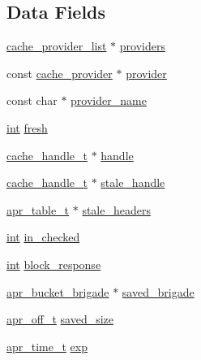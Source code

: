 \subsection*{Data Fields}
\begin{DoxyCompactItemize}
\item 
\hyperlink{structcache__provider__list}{cache\+\_\+provider\+\_\+list} $\ast$ \hyperlink{structcache__request__rec_afeb71f387482c679d90de359869b8e10}{providers}
\item 
const \hyperlink{structcache__provider}{cache\+\_\+provider} $\ast$ \hyperlink{structcache__request__rec_aa97c7f2b0167adee182cce9f2c66b0eb}{provider}
\item 
const char $\ast$ \hyperlink{structcache__request__rec_ad15b24a12858815a315f37152111b41d}{provider\+\_\+name}
\item 
\hyperlink{pcre_8txt_a42dfa4ff673c82d8efe7144098fbc198}{int} \hyperlink{structcache__request__rec_a00964c1b7d5f53314ea2a2b8899b5d93}{fresh}
\item 
\hyperlink{group__MOD__CACHE_ga6b7854a2592838a565bdee8f94343aab}{cache\+\_\+handle\+\_\+t} $\ast$ \hyperlink{structcache__request__rec_ade71ff36fe9a713fd081fa45524151f1}{handle}
\item 
\hyperlink{group__MOD__CACHE_ga6b7854a2592838a565bdee8f94343aab}{cache\+\_\+handle\+\_\+t} $\ast$ \hyperlink{structcache__request__rec_a17c5946aa60de5806a2af38ef7b91507}{stale\+\_\+handle}
\item 
\hyperlink{structapr__table__t}{apr\+\_\+table\+\_\+t} $\ast$ \hyperlink{structcache__request__rec_a7bdf3605a965ddd6b566babb830bde8b}{stale\+\_\+headers}
\item 
\hyperlink{pcre_8txt_a42dfa4ff673c82d8efe7144098fbc198}{int} \hyperlink{structcache__request__rec_a293ec343b59a0335dd1d0efd55a09dc6}{in\+\_\+checked}
\item 
\hyperlink{pcre_8txt_a42dfa4ff673c82d8efe7144098fbc198}{int} \hyperlink{structcache__request__rec_aabb09b84eacc656fcf093e3038a5a315}{block\+\_\+response}
\item 
\hyperlink{structapr__bucket__brigade}{apr\+\_\+bucket\+\_\+brigade} $\ast$ \hyperlink{structcache__request__rec_a7a6713378ed5d672705842f4e226b5b6}{saved\+\_\+brigade}
\item 
\hyperlink{group__apr__platform_ga6938af9075cec15c88299109381aa984}{apr\+\_\+off\+\_\+t} \hyperlink{structcache__request__rec_ad1e2adaa5df7480ec611053b7bb0fffa}{saved\+\_\+size}
\item 
\hyperlink{group__apr__time_gadb4bde16055748190eae190c55aa02bb}{apr\+\_\+time\+\_\+t} \hyperlink{structcache__request__rec_a7985e66cc113871628b00e40bf9c92a7}{exp}

\end{DoxyCompactItemize}
